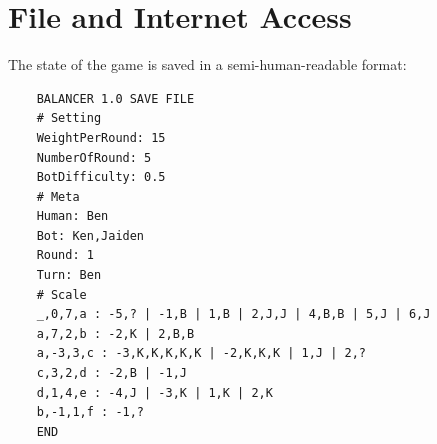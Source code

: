 \documentclass[12pt]{article}
\begin{document}
\section{File and Internet Access}

The state of the game is saved in a semi-human-readable format:

\begin{verbatim}
    BALANCER 1.0 SAVE FILE
    # Setting
    WeightPerRound: 15
    NumberOfRound: 5
    BotDifficulty: 0.5
    # Meta
    Human: Ben
    Bot: Ken,Jaiden
    Round: 1
    Turn: Ben
    # Scale
    _,0,7,a : -5,? | -1,B | 1,B | 2,J,J | 4,B,B | 5,J | 6,J
    a,7,2,b : -2,K | 2,B,B
    a,-3,3,c : -3,K,K,K,K,K | -2,K,K,K | 1,J | 2,?
    c,3,2,d : -2,B | -1,J
    d,1,4,e : -4,J | -3,K | 1,K | 2,K
    b,-1,1,f : -1,?
    END
\end{verbatim}
\end{document}
